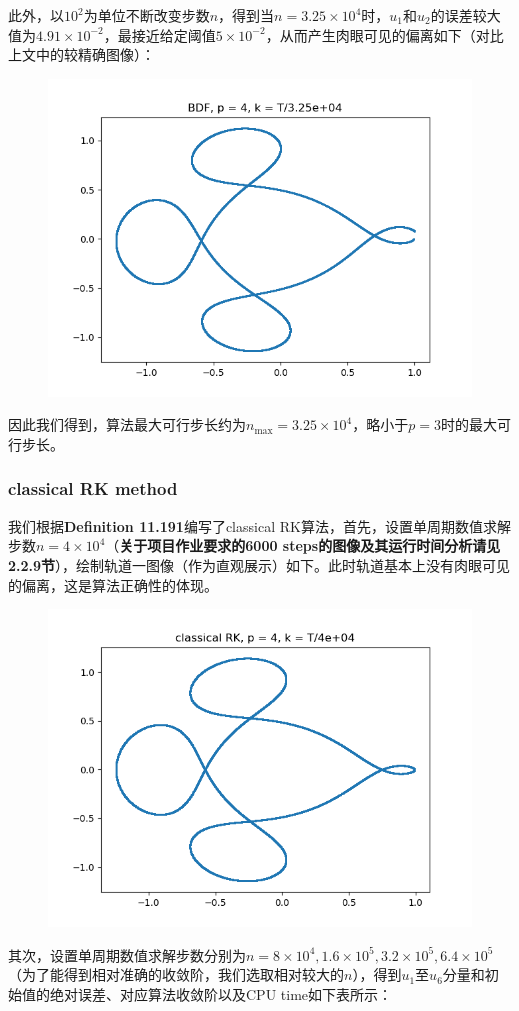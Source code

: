 \documentclass{ctexart}
\begin{document}
\begin{sloppypar}
此外，以$10^2$为单位不断改变步数$n$，得到当$n = 3.25 \times 10^4$时，$u_1$和$u_2$的误差较大值为$4.91 \times 10^{-2}$，最接近给定阈值$5 \times 10^{-2}$，从而产生肉眼可见的偏离如下（对比上文中的较精确图像）：
\begin{figure}[H]
\centering
\includegraphics[scale = 0.45]{./report_src/Figure_24.png}
\end{figure}
因此我们得到，算法最大可行步长约为$n_{\max} = 3.25 \times 10^4$，略小于$p=3$时的最大可行步长。

\subsubsection{classical RK method}
我们根据\textbf{Definition 11.191}编写了classical RK算法，首先，设置单周期数值求解步数$n = 4 \times 10^4$（\textbf{关于项目作业要求的6000 steps的图像及其运行时间分析请见2.2.9节}），绘制轨道一图像（作为直观展示）如下。此时轨道基本上没有肉眼可见的偏离，这是算法正确性的体现。
\begin{figure}[H]
\centering
\includegraphics[scale = 0.45]{./report_src/Figure_25.png}
\end{figure}
其次，设置单周期数值求解步数分别为$n = 8 \times 10^4,1.6 \times 10^5,3.2 \times 10^5, 6.4 \times 10^5$（为了能得到相对准确的收敛阶，我们选取相对较大的$n$），得到$u_1$至$u_6$分量和初始值的绝对误差、对应算法收敛阶以及CPU time如下表所示：


\end{sloppypar}
\end{document}
